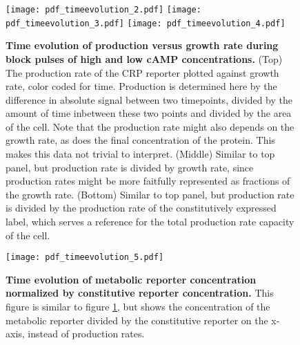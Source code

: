 \begin{figure}%
	\centering
	\texttt{[image: pdf\_timeevolution\_2.pdf]}	
	\texttt{[image: pdf\_timeevolution\_3.pdf]}
	\texttt{[image: pdf\_timeevolution\_4.pdf]}	
\caption{%
		\textbf{Time evolution of production versus growth rate during block pulses of high and low cAMP concentrations.}
		(Top) The production rate of the CRP reporter plotted against growth rate, color coded for time. Production is determined here by the difference in absolute signal between two timepoints, divided by the amount of time inbetween these two points and divided by the area of the cell. Note that the production rate might also depends on the growth rate, as does the final concentration of the protein. This makes this data not trivial to interpret.
		(Middle) Similar to top panel, but production rate is divided by growth rate, since production rates might be more faitfully represented as fractions of the growth rate.
		(Bottom) Similar to top panel, but production rate is divided by the production rate of the constitutively expressed label, which serves a reference for the total production rate capacity of the cell.
        \label{fig:CRP:productiontimeevolutions}
}
\end{figure}%

\begin{figure}%
	\centering
	\texttt{[image: pdf\_timeevolution\_5.pdf]}
	\caption{ 
		\textbf{Time evolution of metabolic reporter concentration normalized by constitutive reporter concentration.}
		This figure is similar to figure \ref{fig:CRP:productiontimeevolutions}, but shows the concentration of the metabolic reporter divided by the constitutive reporter on the x-axis, instead of production rates.
	}
	\label{fig:CRP:normalizedconcentrationtimeevolutions}
\end{figure}%



